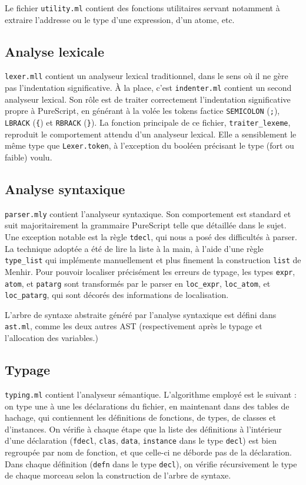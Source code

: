 \documentclass[12pt,a4paper]{article}
\begin{document}
Le fichier \texttt{utility.ml} contient des fonctions utilitaires servant notamment à extraire l'addresse ou le type d'une expression, d'un atome, etc.

\subsection{Analyse lexicale}
\texttt{lexer.mll} contient un analyseur lexical traditionnel, dans le sens où il ne gère pas l'indentation significative. 
À la place, c'est \texttt{indenter.ml} contient un second analyseur lexical. 
Son rôle est de traiter correctement l'indentation significative propre à PureScript, en générant à la volée les tokens factice \texttt{SEMICOLON} (\texttt{;}), \texttt{LBRACK} (\texttt{\{}) et \texttt{RBRACK} (\texttt{\}}). 
La fonction principale de ce fichier, \texttt{traiter\_lexeme}, reproduit le comportement attendu d'un analyseur lexical.
Elle a sensiblement le même type que \texttt{Lexer.token}, à l'exception du booléen précisant le type (fort ou faible) voulu.

\subsection{Analyse syntaxique}
\texttt{parser.mly} contient l'analyseur syntaxique. Son comportement est standard et suit majoritairement la grammaire PureScript telle que détaillée dans le sujet. Une exception notable est la règle \texttt{tdecl}, qui nous a posé des difficultés à parser. La technique adoptée a été de lire la liste à la main, à l'aide d'une règle \texttt{type\_list} qui implémente manuellement et plus finement la construction \texttt{list} de Menhir. Pour pouvoir localiser précisément les erreurs de typage, les types \texttt{expr}, \texttt{atom}, et \texttt{patarg} sont transformés par le parser en \texttt{loc\_expr}, \texttt{loc\_atom}, et \texttt{loc\_patarg}, qui sont décorés des informations de localisation.

L'arbre de syntaxe abstraite généré par l'analyse syntaxique est défini dans \texttt{ast.ml}, comme les deux autres AST (respectivement après le typage et l'allocation des variables.)

\subsection{Typage}
\texttt{typing.ml} contient l'analyseur sémantique. L'algorithme employé est le suivant : on type une à une les déclarations du fichier, en maintenant dans des tables de hachage, qui contiennent les définitions de fonctions, de types, de classes et d'instances. On vérifie à chaque étape que la liste des définitions à l'intérieur d'une déclaration (\texttt{fdecl}, \texttt{clas}, \texttt{data}, \texttt{instance} dans le type \texttt{decl}) est bien regroupée par nom de fonction, et que celle-ci ne déborde pas de la déclaration. Dans chaque définition (\texttt{defn} dans le type \texttt{decl}), on vérifie récursivement le type de chaque morceau selon la construction de l'arbre de syntaxe. 
\end{document}
